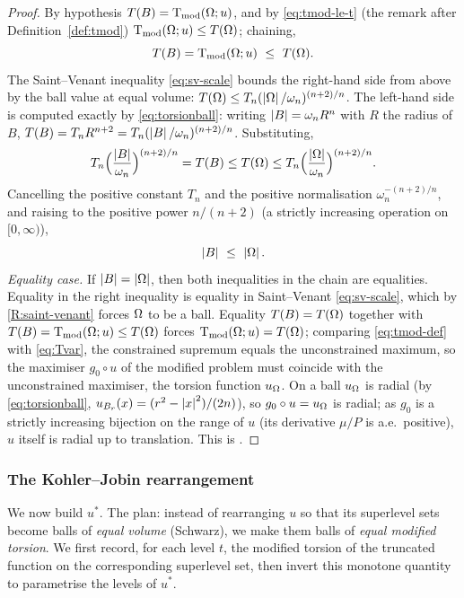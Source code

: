 \begin{proof}
By hypothesis $T(B)=\operatorname{T_{\mathrm{mod}}}(\Omega;u)$, and by \eqref{eq:tmod-le-t} (the remark
after Definition~\ref{def:tmod}) $\operatorname{T_{\mathrm{mod}}}(\Omega;u)\le T(\Omega)$; chaining,
\[
  T(B)=\operatorname{T_{\mathrm{mod}}}(\Omega;u)\ \le\ T(\Omega).
\]
The Saint--Venant inequality \eqref{eq:sv-scale} bounds the right-hand side
from above by the ball value at equal volume:
$T(\Omega)\le T_n(\left|\Omega\right|/\omega_n)^{(n+2)/n}$. The left-hand side is computed
exactly by \eqref{eq:torsionball}: writing $\left|B\right|=\omega_n R^n$ with $R$
the radius of $B$, $T(B)=T_n R^{n+2}=T_n(\left|B\right|/\omega_n)^{(n+2)/n}$.
Substituting,
\[
  T_n\Bigl(\frac{\left|B\right|}{\omega_n}\Bigr)^{(n+2)/n}
  =T(B)\le T(\Omega)\le
  T_n\Bigl(\frac{\left|\Omega\right|}{\omega_n}\Bigr)^{(n+2)/n}.
\]
Cancelling the positive constant $T_n$ and the positive normalisation
$\omega_n^{-(n+2)/n}$, and raising to the positive power $n/(n+2)$ (a
strictly increasing operation on $[0,\infty)$),
\[
  \left|B\right|\ \le\ \left|\Omega\right| .
\]
\emph{Equality case.} If $\left|B\right|=\left|\Omega\right|$, then both inequalities in the
chain are equalities. Equality in the right inequality is equality in
Saint--Venant \eqref{eq:sv-scale}, which by \ref{R:saint-venant} forces $\Omega$
to be a ball. Equality $T(B)=T(\Omega)$ together with
$T(B)=\operatorname{T_{\mathrm{mod}}}(\Omega;u)\le T(\Omega)$ forces $\operatorname{T_{\mathrm{mod}}}(\Omega;u)=T(\Omega)$; comparing
\eqref{eq:tmod-def} with \eqref{eq:Tvar}, the constrained supremum equals
the unconstrained maximum, so the maximiser $g_0\circ u$ of the modified
problem must coincide with the unconstrained maximiser, the torsion function
$u_\Omega$. On a ball $u_\Omega$ is radial (by \eqref{eq:torsionball},
$u_{B_r}(x)=(r^2-\left|x\right|^2)/(2n)$), so $g_0\circ u=u_\Omega$ is radial; as $g_0$
is a strictly increasing bijection on the range of $u$ (its derivative
$\mu/P$ is a.e.\ positive), $u$ itself is radial up to translation. This is
\cite[Prop.~3.8]{Brasco2014}.
\end{proof}

\subsubsection*{The Kohler--Jobin rearrangement}

We now build $u^*$. The plan: instead of rearranging $u$ so that its
superlevel sets become balls of \emph{equal volume} (Schwarz), we make them
balls of \emph{equal modified torsion}. We first record, for each level $t$,
the modified torsion of the truncated function on the corresponding
superlevel set, then invert this monotone quantity to parametrise the levels
of $u^*$.

